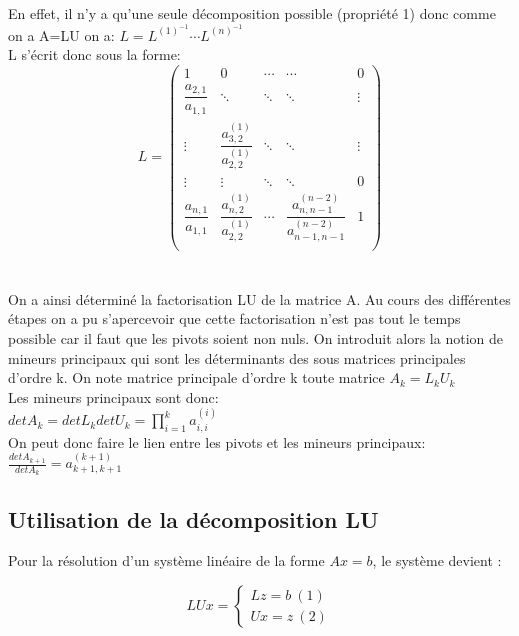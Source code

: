 \documentclass[a4paper,12pt]{report}
\begin{document}
En effet, il n'y a qu'une seule décomposition possible (propriété 1) donc comme on a A=LU on a: $L=L^{(1)^{-1}}\cdots L^{(n)^{-1}}$\\
L s'écrit donc sous la forme: \\
$$L=\begin{pmatrix}
1 &0 & \cdots &\cdots  & 0\\
\dfrac{a_{2,1}}{a_{1,1}}& \ddots & \ddots & \ddots & \vdots\\
\vdots & \dfrac{a_{3,2}^{(1)}}{a_{2,2}^{(1)}}&\ddots&\ddots &\vdots\\
\vdots & \vdots & \ddots & \ddots & 0\\
\dfrac{a_{n,1}}{a_{1,1}} & \dfrac{a_{n,2}^{(1)}}{a_{2,2}^{(1)}} & \cdots& \dfrac{a_{n,n-1}^{(n-2)}}{a_{n-1,n-1}^{(n-2)}}  & 1 \\

\end{pmatrix}$$\\\\


On a ainsi déterminé la factorisation LU de la matrice A. Au cours des différentes étapes on a pu s'apercevoir que cette factorisation n'est pas tout le temps possible car il faut que les pivots soient non nuls. On introduit alors la notion de mineurs principaux qui sont les déterminants des sous matrices principales d'ordre k. On note matrice principale d'ordre k toute matrice $A_{k}=L_{k}U_{k}$\\
Les mineurs principaux sont donc:\\
$detA_{k}=detL_{k}detU_{k}=\prod_{i=1}^{k}a_{i,i}^{(i)}$\\

On peut donc faire le lien entre les pivots et les mineurs principaux:\\
$\frac{detA_{k+1}}{detA_{k}}=a_{k+1,k+1}^{(k+1)}$\\



\subsection{Utilisation de la décomposition LU}


Pour la résolution d'un système linéaire de la forme    $A x=b$, le système devient :



$$LUx=\left\{
\begin{aligned}
Lz=b\   (1)\\
Ux=z \  (2)
\end{aligned}
\right.$$\\
\end{document}
